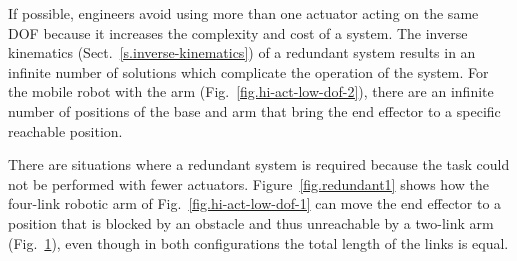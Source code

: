 If possible, engineers avoid using more than one actuator acting on the same DOF because it increases the complexity and cost of a system. The inverse kinematics (Sect.~\ref{s.inverse-kinematics}) of a redundant system results in an infinite number of solutions which complicate the operation of the system. For the mobile robot with the arm (Fig.~\ref{fig.hi-act-low-dof-2}), there are an infinite number of positions of the base and arm that bring the end effector to a specific reachable position.

There are situations where a redundant system is required because the task could not be performed with fewer actuators. Figure~\ref{fig.redundant1} shows how the four-link robotic arm of Fig.~\ref{fig.hi-act-low-dof-1} can move the end effector to a position that is blocked by an obstacle and thus unreachable by a two-link arm (Fig.~\ref{fig.redundant2}), even though in both configurations the total length of the links is equal.

\begin{figure}
\subfigures
{}
\hspace{\fill}
\label{fig.redundant1}
\label{fig.redundant2}
\end{figure}

